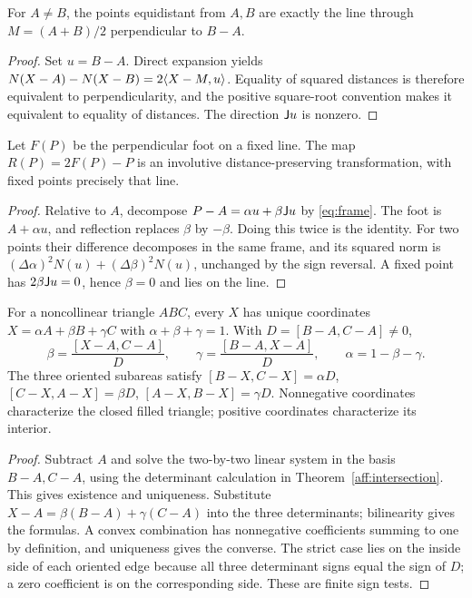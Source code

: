 \begin{theorem}\label{aff:bisector}
For $A\ne B$, the points equidistant from $A,B$ are exactly the line
through $M=(A+B)/2$ perpendicular to $B-A$.
\end{theorem}
\begin{proof}
Set $u=B-A$. Direct expansion yields
$N(X-A)-N(X-B)=2\langle X-M,u\rangle$.
Equality of squared distances is therefore equivalent to perpendicularity,
and the positive square-root convention makes it equivalent to equality
of distances. The direction $\mathsf J u$ is nonzero.
\end{proof}

\begin{theorem}\label{aff:reflection}
Let $F(P)$ be the perpendicular foot on a fixed line. The map
$R(P)=2F(P)-P$ is an involutive distance-preserving transformation, with
fixed points precisely that line.
\end{theorem}
\begin{proof}
Relative to $A$, decompose $P-A=\alpha u+\beta\mathsf J u$ by
\eqref{eq:frame}. The foot is $A+\alpha u$, and reflection replaces
$\beta$ by $-\beta$. Doing this twice is the identity. For two points
their difference decomposes in the same frame, and its squared norm is
$(\Delta\alpha)^2N(u)+(\Delta\beta)^2N(u)$, unchanged by the sign reversal.
A fixed point has $2\beta\mathsf J u=0$, hence $\beta=0$ and lies on the line.
\end{proof}

\begin{theorem}
\label{aff:barycentric}
For a noncollinear triangle $ABC$, every $X$ has unique coordinates
$X=\alpha A+\beta B+\gamma C$ with $\alpha+\beta+\gamma=1$.
With $D=[B-A,C-A]\ne0$,
\[
 \beta=\frac{[X-A,C-A]}D,\qquad
 \gamma=\frac{[B-A,X-A]}D,\qquad \alpha=1-\beta-\gamma.
\]
The three oriented subareas satisfy
$[B-X,C-X]=\alpha D$, $[C-X,A-X]=\beta D$,
$[A-X,B-X]=\gamma D$. Nonnegative coordinates characterize the closed
filled triangle; positive coordinates characterize its interior.
\end{theorem}
\begin{proof}
Subtract $A$ and solve the two-by-two linear system in the basis
$B-A,C-A$, using the determinant calculation in
Theorem~\ref{aff:intersection}. This gives existence and uniqueness.
Substitute $X-A=\beta(B-A)+\gamma(C-A)$ into the three determinants;
bilinearity gives the formulas. A convex combination has nonnegative
coefficients summing to one by definition, and uniqueness gives the converse.
The strict case lies on the inside side of each oriented edge because
all three determinant signs equal the sign of $D$; a zero coefficient is
on the corresponding side. These are finite sign tests.
\end{proof}

